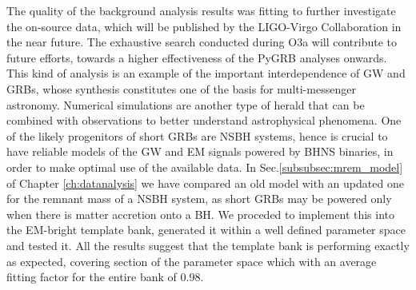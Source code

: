 \documentclass[binding=0.6cm, LaM]{sapthesis}
\begin{document}
	The quality of the background analysis results was fitting to further investigate
	the on-source data, which will be published by the LIGO-Virgo Collaboration in the near future.
	The exhaustive search conducted during O3a will contribute to future  efforts,
	towards a higher effectiveness of the {\ttfamily PyGRB} analyses onwards.
	This kind of analysis is an example of the important interdependence of GW and GRBs,
	whose synthesis constitutes one of the basis for multi-messenger astronomy.
	Numerical simulations are another type of herald that can be combined with observations 
	to better understand astrophysical phenomena.
	One of the likely progenitors of short GRBs are NSBH systems, 
	hence is crucial to have reliable models of the GW and EM signals powered by BHNS binaries,
	in order  to  make optimal use of the available data.
	In Sec.\ref{subsubsec:mrem_model} of Chapter \ref{ch:datanalysis} we have compared an old model \cite{206}  
	with an updated one \cite{205} for the remnant mass of a NSBH system,
	as short GRBs may be powered only when there is matter accretion onto a BH.
	We proceded to implement this into the EM-bright template bank,
	generated  it within a well defined parameter space and tested it.
	All the results suggest that the template bank is performing exactly as expected,
	covering section of the parameter space which 
	with an average fitting factor for the entire bank of 0.98.


\backmatter
\cleardoublepage

\end{document}

